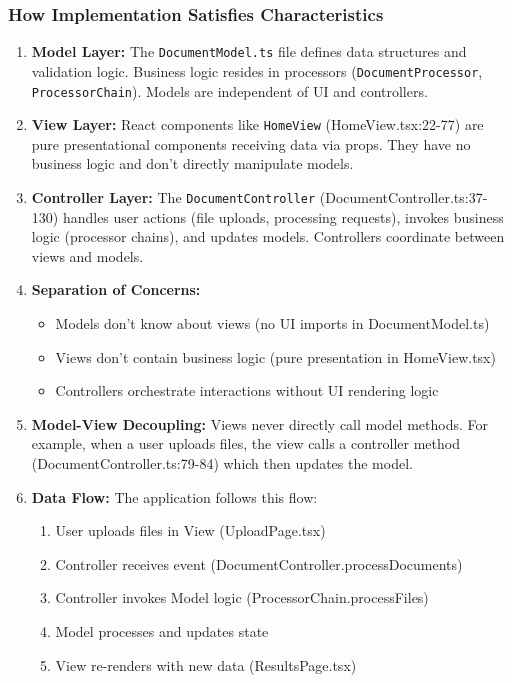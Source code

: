 \documentclass[11pt]{article}
\begin{document}
\subsubsection{How Implementation Satisfies Characteristics}

\begin{enumerate}[noitemsep]
    \item \textbf{Model Layer:} The \texttt{DocumentModel.ts} file defines data structures and validation logic. Business logic resides in processors (\texttt{DocumentProcessor}, \texttt{ProcessorChain}). Models are independent of UI and controllers.

    \item \textbf{View Layer:} React components like \texttt{HomeView} (HomeView.tsx:22-77) are pure presentational components receiving data via props. They have no business logic and don't directly manipulate models.

    \item \textbf{Controller Layer:} The \texttt{DocumentController} (DocumentController.ts:37-130) handles user actions (file uploads, processing requests), invokes business logic (processor chains), and updates models. Controllers coordinate between views and models.

    \item \textbf{Separation of Concerns:}
    \begin{itemize}[noitemsep]
        \item Models don't know about views (no UI imports in DocumentModel.ts)
        \item Views don't contain business logic (pure presentation in HomeView.tsx)
        \item Controllers orchestrate interactions without UI rendering logic
    \end{itemize}

    \item \textbf{Model-View Decoupling:} Views never directly call model methods. For example, when a user uploads files, the view calls a controller method (DocumentController.ts:79-84) which then updates the model.

    \item \textbf{Data Flow:} The application follows this flow:
    \begin{enumerate}[noitemsep]
        \item User uploads files in View (UploadPage.tsx)
        \item Controller receives event (DocumentController.processDocuments)
        \item Controller invokes Model logic (ProcessorChain.processFiles)
        \item Model processes and updates state
        \item View re-renders with new data (ResultsPage.tsx)
    \end{enumerate}
\end{enumerate}
\end{document}

